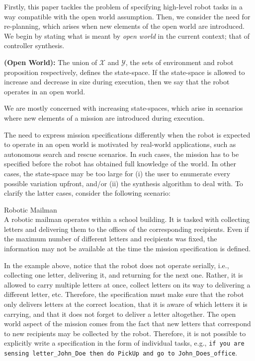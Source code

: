 Firstly, this paper tackles the problem of specifying high-level robot tasks in a way compatible with the open world assumption. Then, we consider the need for re-planning, which arises when new elements of the open world are introduced. We begin by stating what is meant by \emph{open world} in the current context; that of controller synthesis.

\begin{myDefinition}
	\textbf{(Open World):} The union of $\mathcal{X}$ and $\mathcal{Y}$, the sets of environment and robot proposition respectively, defines the state-space. If the state-space is allowed to increase and decrease in size during execution, then we say that the robot operates in an open world.
\end{myDefinition}
We are mostly concerned with increasing state-spaces, which arise in scenarios where new elements of a mission are introduced during execution.

The need to express mission specifications differently when the robot is expected to operate in an open world is motivated by real-world applications, such as autonomous search and rescue scenarios. In such cases, the mission has to be specified before the robot has obtained full knowledge of the world. In other cases, the state-space may be too large for (i) the user to enumerate every possible variation upfront, and/or (ii) the synthesis algorithm to deal with. To clarify the latter cases, consider the following scenario:

\begin{myExample}\label{Ex:mailman1} Robotic Mailman\\
	A robotic mailman operates within a school building. It is tasked with collecting letters and delivering them to the offices of the corresponding recipients. Even if the maximum number of different letters and recipients was fixed, the information may not be available at the time the mission specification is defined. 
\end{myExample}

In the example above, notice that the robot does not operate serially, i.e., collecting one letter, delivering it, and returning for the next one. Rather, it is allowed to carry multiple letters at once, collect letters on its way to delivering a different letter, etc. Therefore, the specification must make sure that the robot only delivers letters at the correct location, that it is aware of which letters it is carrying, and that it does not forget to deliver a letter altogether. The open world aspect of the mission comes from the fact that new letters that correspond to new recipients may be collected by the robot. Therefore, it is not possible to explicitly write a specification in the form of individual tasks, e.g., \texttt{if you are sensing letter\_John\_Doe then do PickUp and go to John\_Does\_office}.

